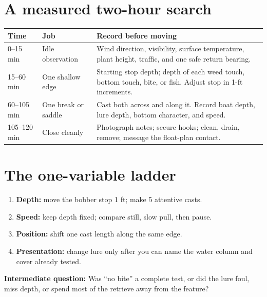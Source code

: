 \newpage
\section{A measured two-hour search}
\begin{tabularx}{\linewidth}{@{}p{.16\linewidth}p{.25\linewidth}X@{}}
\toprule Time&Job&Record before moving\\\midrule
0--15 min&Idle observation&Wind direction, visibility, surface temperature,
plant height, traffic, and one safe return bearing.\\
15--60 min&One shallow edge&Starting stop depth; depth of each weed touch,
bottom touch, bite, or fish. Adjust stop in 1-ft increments.\\
60--105 min&One break or saddle&Cast both across and along it. Record boat
depth, lure depth, bottom character, and speed.\\
105--120 min&Close cleanly&Photograph notes; secure hooks; clean, drain, remove;
message the float-plan contact.\\
\bottomrule
\end{tabularx}

\begin{center}
\end{center}

\section{The one-variable ladder}
\begin{enumerate}
\item \textbf{Depth:} move the bobber stop 1 ft; make 5 attentive casts.
\item \textbf{Speed:} keep depth fixed; compare still, slow pull, then pause.
\item \textbf{Position:} shift one cast length along the same edge.
\item \textbf{Presentation:} change lure only after you can name the water
column and cover already tested.
\end{enumerate}
\textbf{Intermediate question:} Was “no bite” a complete test, or did the lure
foul, miss depth, or spend most of the retrieve away from the feature?

